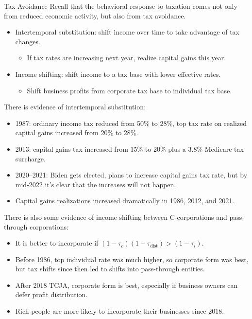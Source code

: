 \documentclass[10pt]{extarticle}
\begin{document}
  \begin{problem}{Tax Avoidance}
    Recall that the behavioral response to taxation comes not only from reduced economic activity, but also from tax avoidance.
    \begin{itemize}
      \item Intertemporal substitution: shift income over time to take advantage of tax changes.
        \begin{itemize}
          \item If tax rates are increasing next year, realize capital gains this year.
        \end{itemize}
      \item Income shifting: shift income to a tax base with lower effective rates.
        \begin{itemize}
          \item Shift business profits from corporate tax base to individual tax base.
        \end{itemize}
    \end{itemize}
    There is evidence of intertemporal substitution:
    \begin{itemize}
      \item 1987: ordinary income tax reduced from 50\% to 28\%, top tax rate on realized capital gains increased from 20\% to 28\%.
      \item 2013: capital gains tax increased from 15\% to 20\% plus a 3.8\% Medicare tax surcharge.
      \item 2020--2021: Biden gets elected, plans to increase capital gains tax rate, but by mid-2022 it's clear that the increases will not happen.
      \item Capital gains realizations increased dramatically in 1986, 2012, and 2021.
    \end{itemize}
    There is also some evidence of income shifting between C-corporations and pass-through corporations:
    \begin{itemize}
      \item It is better to incorporate if $(1-\tau_c)(1-\tau_{\text{dist}}) > (1-\tau_i)$.
      \item Before 1986, top individual rate was much higher, so corporate form was best, but tax shifts since then led to shifts into pass-through entities.
      \item After 2018 TCJA, corporate form is best, especially if business owners can defer profit distribution.
      \item Rich people are more likely to incorporate their businesses since 2018.
    \end{itemize}
  \end{problem}
\end{document}
